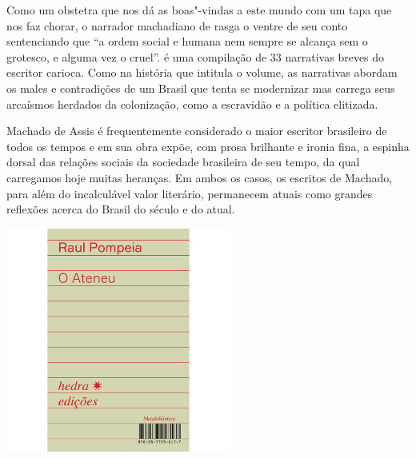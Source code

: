 \hspace*{-7cm}\hrulefill\hspace*{-7cm}

\medskip

\noindent{}Como um obstetra que nos dá as boas"-vindas a este mundo com um tapa que nos faz chorar, o narrador machadiano de {} rasga o ventre de seu conto sentenciando que “a ordem social e humana nem sempre se alcança sem o grotesco, e alguma vez o cruel”. {} é uma compilação de 33 narrativas breves do escritor carioca. Como na história que intitula o volume, as narrativas abordam os males e contradições de um Brasil que tenta se modernizar mas carrega seus arcaísmos herdados da colonização, como a escravidão e a política elitizada.

Machado de Assis é frequentemente considerado o maior escritor brasileiro de todos os tempos e em sua obra expõe, com prosa brilhante e ironia fina, a espinha dorsal das relações sociais da sociedade brasileira de seu tempo, da qual carregamos hoje muitas heranças. Em ambos os casos, os escritos de Machado, para além do incalculável valor literário, permanecem atuais como grandes reflexões acerca do Brasil do século  e do atual.


\vfill

\hspace*{-.4cm}\begin{minipage}[c]{.5\linewidth}
\small{
{}}
\end{minipage}

\pagebreak %

\begin{center}
\hspace*{.5cm}\includegraphics[width=74mm]{./grid/ateneu.jpg}
\end{center}

